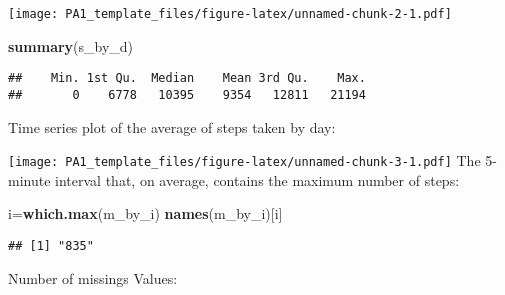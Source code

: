 \documentclass[
]{article}
\newenvironment{Shaded}{\begin{snugshade}}{\end{snugshade}}
\newcommand{\DataTypeTok}[1]{\textcolor[rgb]{0.13,0.29,0.53}{#1}}
\newcommand{\KeywordTok}[1]{\textcolor[rgb]{0.13,0.29,0.53}{\textbf{#1}}}
\newcommand{\NormalTok}[1]{#1}
\newcommand{\OperatorTok}[1]{\textcolor[rgb]{0.81,0.36,0.00}{\textbf{#1}}}
\newcommand{\OtherTok}[1]{\textcolor[rgb]{0.56,0.35,0.01}{#1}}
\newcommand{\StringTok}[1]{\textcolor[rgb]{0.31,0.60,0.02}{#1}}
\begin{document}
\texttt{[image: PA1\_template\_files/figure-latex/unnamed-chunk-2-1.pdf]}

\begin{Shaded}
\begin{Highlighting}[]
\KeywordTok{summary}\NormalTok{(s_by_d)}
\end{Highlighting}
\end{Shaded}

\begin{verbatim}
##    Min. 1st Qu.  Median    Mean 3rd Qu.    Max. 
##       0    6778   10395    9354   12811   21194
\end{verbatim}

Time series plot of the average of steps taken by day:

\begin{Shaded}
\end{Shaded}

\texttt{[image: PA1\_template\_files/figure-latex/unnamed-chunk-3-1.pdf]}
The 5-minute interval that, on average, contains the maximum number of
steps:

\begin{Shaded}
\begin{Highlighting}[]
\NormalTok{i=}\KeywordTok{which.max}\NormalTok{(m_by_i)}
\KeywordTok{names}\NormalTok{(m_by_i)[i]}
\end{Highlighting}
\end{Shaded}

\begin{verbatim}
## [1] "835"
\end{verbatim}

Number of missings Values:

\begin{Shaded}
\end{Shaded}
\end{document}
